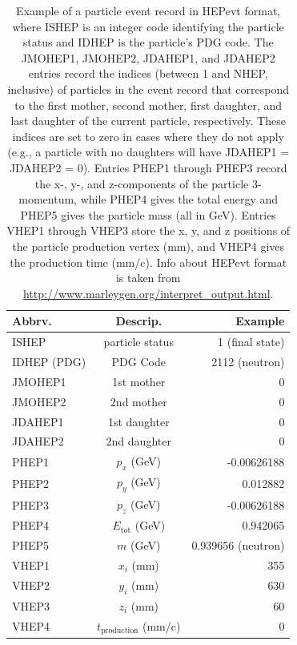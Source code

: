 \documentclass[8pt]{refart}
\begin{document}
\begin{table}[H]
\centering
\begin{tabular}{|l|c|r|}
    \hline
     Abbrv. & Descrip. & Example\\
     \hline
     \hline
     ISHEP &  particle status & 1 (final state)\\
     \hline
     IDHEP (PDG) & PDG Code & 2112 (neutron)\\
     \hline
     JMOHEP1 & 1st mother & 0\\
     \hline
     JMOHEP2 & 2nd mother & 0\\
     \hline
     JDAHEP1 & 1st daughter & 0\\
     \hline
     JDAHEP2 & 2nd daughter & 0\\
     \hline
     PHEP1 & $p_x$ (GeV) & -0.00626188\\
     \hline
     PHEP2 & $p_y$ (GeV) & 0.012882\\
     \hline
     PHEP3 & $p_z$ (GeV) & -0.00626188\\
     \hline
     PHEP4 & $E_{\mathrm{tot}}$ (GeV) & 0.942065\\
     \hline
     PHEP5 & $m$ (GeV) & 0.939656 (neutron)\\
     \hline
     VHEP1 & $x_i$ (mm)& 355\\
     \hline
     VHEP2 & $y_i$ (mm)& 630\\
     \hline
     VHEP3 & $z_i$ (mm)& 60\\
     \hline
     VHEP4 & $t_{\mathrm{production}}$ (mm/c) & 0\\
     \hline
\end{tabular}
\caption{Example of a particle event record in HEPevt format, where ISHEP is an integer code identifying the particle status and IDHEP is the particle’s PDG code.  The JMOHEP1, JMOHEP2, JDAHEP1, and JDAHEP2 entries record the indices (between 1 and NHEP, inclusive) of particles in the event record that correspond to the first mother, second mother, first daughter, and last daughter of the current particle, respectively. These indices are set to zero in cases where they do not apply (e.g., a particle with no daughters will have JDAHEP1 = JDAHEP2 = 0). Entries PHEP1 through PHEP3 record the x-, y-, and z-components of the particle 3-momentum, while PHEP4 gives the total energy and PHEP5 gives the particle mass (all in GeV). Entries VHEP1 through VHEP3 store the x, y, and z positions of the particle production vertex (mm), and VHEP4 gives the production time (mm/c).  Info about HEPevt format is taken from \url{http://www.marleygen.org/interpret_output.html}.}
\end{table}
\end{document}
